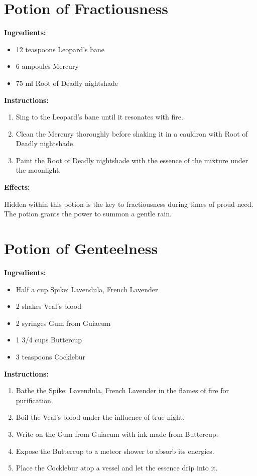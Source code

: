 \documentclass{article}
\begin{document}
\newpage
\section*{Potion of Fractiousness}

\textbf{Ingredients:}

\begin{itemize}
  \item 12 teaspoons Leopard's bane
  \item 6 ampoules Mercury
  \item 75 ml Root of Deadly nightshade
\end{itemize}

\textbf{Instructions:}

\begin{enumerate}
  \item Sing to the Leopard's bane until it resonates with fire.
  \item Clean the Mercury thoroughly before shaking it in a cauldron with Root of Deadly nightshade.
  \item Paint the Root of Deadly nightshade with the essence of the mixture under the moonlight.
\end{enumerate}

\textbf{Effects:}

Hidden within this potion is the key to fractiousness during times of proud need. The potion grants the power to summon a gentle rain.

\newpage
\section*{Potion of Genteelness}

\textbf{Ingredients:}

\begin{itemize}
  \item Half a cup Spike: Lavendula, French Lavender
  \item 2 shakes Veal's blood
  \item 2 syringes Gum from Guiacum
  \item 1 3/4 cups Buttercup
  \item 3 teaspoons Cocklebur
\end{itemize}

\textbf{Instructions:}

\begin{enumerate}
  \item Bathe the Spike: Lavendula, French Lavender in the flames of fire for purification.
  \item Boil the Veal's blood under the influence of true night.
  \item Write on the Gum from Guiacum with ink made from Buttercup.
  \item Expose the Buttercup to a meteor shower to absorb its energies.
  \item Place the Cocklebur atop a vessel and let the essence drip into it.
\end{enumerate}
\end{document}
